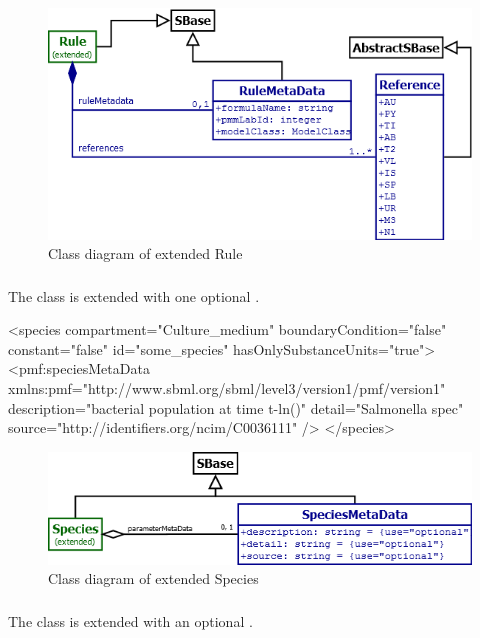\begin{figure}
	\includegraphics[scale=0.7]{img/rule_uml}
	\caption{Class diagram of extended Rule}
	\label{rule_uml}
\end{figure}

\subsubsection{}
The \Species class is extended with one optional \SpeciesMetaData.
\begin{example}
<species compartment="Culture_medium" boundaryCondition="false" constant="false"
  id="some_species" hasOnlySubstanceUnits="true">
  <pmf:speciesMetaData xmlns:pmf="http://www.sbml.org/sbml/level3/version1/pmf/version1"
    description="bacterial population at time t-ln()" detail="Salmonella spec"
    source="http://identifiers.org/ncim/C0036111" />
</species>
\end{example}

\begin{figure}
	\includegraphics[scale=0.7]{img/species_uml}
	\caption{Class diagram of extended Species}
	\label{species_uml}
\end{figure}

\subsubsection{}
The \UnitTransformation class is extended with an optional \UnitTransformation.


